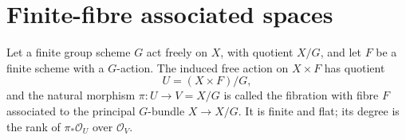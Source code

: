 
\section{Finite-fibre associated spaces}
\label{mumford-III12-associated-source}

\begin{definition}
\label{mumford-def-associated-finite-fibre}
Let a finite group scheme $G$ act freely on $X$, with quotient $X/G$, and
let $F$ be a finite scheme with a $G$-action. The induced free action on
$X\times F$ has quotient
\[
U=(X\times F)/G,
\]
and the natural morphism $\pi:U\to V=X/G$ is called the fibration with
fibre $F$ associated to the principal $G$-bundle $X\to X/G$. It is finite
and flat; its degree is the rank of $\pi_*\mathcal O_U$ over
$\mathcal O_V$.
\end{definition}

